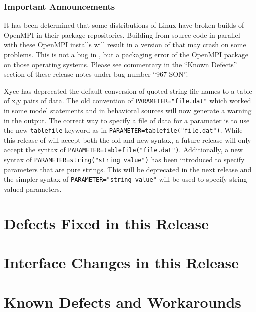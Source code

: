 \documentclass{article}
\begin{document}
\subsubsection*{Important Announcements}
\begin{XyceItemize}
\item It has been determined that some distributions of Linux have
  broken builds of OpenMPI in their package repositories.  Building
  \Xyce{} from source code in parallel with these OpenMPI installs
  will result in a version of \Xyce{} that may crash on some problems.
  This is not a bug in \Xyce{}, but a packaging error of the OpenMPI
  package on those operating systems.  Please see commentary in the
  ``Known Defects'' section of these release notes under bug number
  ``967-SON''.
\item Xyce has deprecated the default conversion of quoted-string file
  names to a table of x,y pairs of data.  The old convention of
  \texttt{PARAMETER="file.dat"} which worked in some model statements
  and in behavioral sources will now generate a warning in the \Xyce{}
  output.  The correct way to specify a file of data for a paramater
  is to use the new \texttt{tablefile} keyword as in
  \texttt{PARAMETER=tablefile("file.dat")}.  While this release of
  \Xyce{} will accept both the old and new syntax, a future release
  will only accept the syntax of
  \texttt{PARAMETER=tablefile("file.dat")}.  Additionally, a new
  syntax of \texttt{PARAMETER=string("string value")} has been
  introduced to specify parameters that are pure strings.  This will
  be deprecated in the next release and the simpler syntax of
  \texttt{PARAMETER="string value"} will be used to specify string
  valued parameters.
\end{XyceItemize}

\newpage
\section{Defects Fixed in this Release}



\newpage
\section{Interface Changes in this Release}



\newpage
\section{Known Defects and Workarounds}

\end{document}
